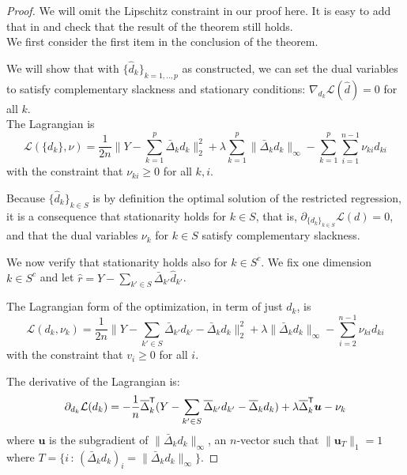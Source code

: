 \begin{proof} 
We will omit the Lipschitz constraint in our proof here. It is easy to add that in and check that the result of the theorem still holds.\\

We first consider the first item in the conclusion of the theorem.

We will show that with $\{\hat{d}_k\}_{k=1,..,p}$ as constructed, we can set the dual variables to satisfy complementary slackness and stationary conditions: $\nabla_{d_k} \mathcal{L}(\hat{d})  = 0$ for all $k$.\\ 

The Lagrangian is
\begin{equation}
\label{eqn:full_lagrange}
\mathcal{L}( \{ d_k \}, \nu) = 
  \frac{1}{2n} \Big\| 
    Y - \sum_{k=1}^p  \bar{\Delta}_k d_k  \Big\|_2^2 + 
    \lambda \sum_{k=1}^p \| \bar{\Delta}_k d_k \|_\infty -
    \sum_{k=1}^p \sum_{i=1}^{n-1} \nu_{ki} d_{ki} 
\end{equation}
with the constraint that $\nu_{ki} \geq 0$ for all $k,i$.

Because $\{\hat{d}_k\}_{k \in S}$ is by definition the optimal solution of the restricted regression, it is a consequence that stationarity holds for $k \in S$, that is, $\partial_{ \{ d_k \}_{k \in S} } \mathcal{L}(d) = 0$, and that the dual variables $\nu_k$ for $k \in S$ satisfy complementary slackness.

We now verify that stationarity holds also for $k \in S^c$. We fix one dimension $k \in S^c$ and let $\hat{r} = Y - \sum_{k' \in S} \bar{\Delta}_{k'} \hat{d}_{k'}$. 

The Lagrangian form of the optimization, in term of just $d_k$, is
\[
\mathcal{L}(d_k, \nu_k) =
  \frac{1}{2n} \big\| Y - \sum_{k' \in S} \bar{\Delta}_{k'} d_{k'} 
  -  \bar{\Delta}_k d_k \big\|_2^2 
   + \lambda \| \bar{\Delta}_k d_k\|_\infty
  - \sum_{i=2}^{n-1} \nu_{ki} d_{ki}
\]
with the constraint that $v_i \geq 0$ for all $i$. 

The derivative of the Lagrangian is:
\begin{align*}
\partial_{d_k} \mathcal{L}(d_k) =  -\frac{1}{n} \overline{\Delta}_k^{\mathsf{T}} ( Y - \sum_{k'\in S} \overline{\Delta}_{k'} d_{k'}  - \overline{\Delta}_k d_k )
        + \lambda \overline{\Delta}_k^{\mathsf{T}} \mbox{\boldmath $u$}
      - \nu_k
\end{align*}
where $\mathbf{u}$ is the subgradient of $\| \bar{\Delta}_k d_k \|_\infty$, an $n$-vector such that $\| \mathbf{u}_T \|_1 = 1$ where $T = \{ i \,:\,  (\bar{\Delta}_k d_k)_i = \| \bar{\Delta}_k d_k \|_\infty \}$.


\end{proof}
